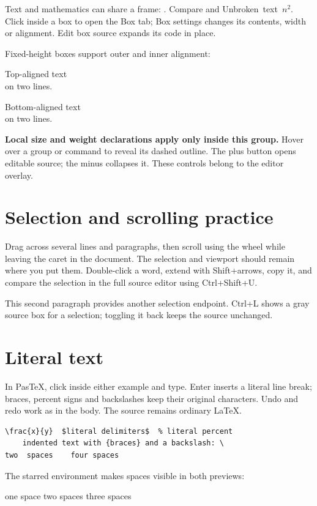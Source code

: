 \documentclass{article}
\begin{document}
Text and mathematics can share a frame: .
Compare  and \mbox{Unbroken text $n^2$}.
Click inside a box to open the Box tab; Box settings changes its contents,
width or alignment. Edit box source expands its code in place.

Fixed-height boxes support outer and inner alignment:
\parbox[t][3em][t]{.35\linewidth}{Top-aligned text\\on two lines.}\quad
\parbox[t][3em][b]{.35\linewidth}{Bottom-aligned text\\on two lines.}

{\small\bfseries Local size and weight declarations apply only inside this group.}
Hover over a group or command to reveal its dashed outline. The plus button
opens editable source; the minus collapses it. These controls belong to the editor overlay.

\section{Selection and scrolling practice}
Drag across several lines and paragraphs, then scroll using the wheel while
leaving the caret in the document. The selection and viewport should remain
where you put them. Double-click a word, extend with Shift+arrows, copy it, and
compare the selection in the full source editor using Ctrl+Shift+U.

This second paragraph provides another selection endpoint. Ctrl+L shows a
gray source box for a selection; toggling it back keeps the source unchanged.

\section{Literal text}
In PasTeX, click inside either example and type. Enter inserts a literal line
break; braces, percent signs and backslashes keep their original characters.
Undo and redo work as in the body. The source remains ordinary \LaTeX.

\begin{verbatim}
\frac{x}{y}  $literal delimiters$  % literal percent
    indented text with {braces} and a backslash: \
two  spaces    four spaces
\end{verbatim}

The starred environment makes spaces visible in both previews:
\begin{verbatim*}
one space  two spaces   three spaces
\end{verbatim*}
\end{document}
